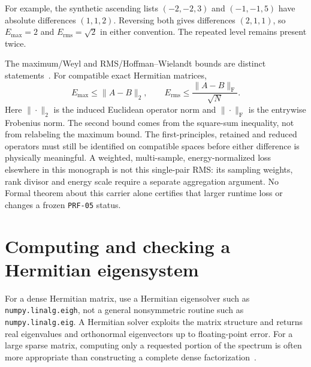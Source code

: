 For example, the synthetic ascending lists $(-2,-2,3)$ and $(-1,-1,5)$
have absolute differences $(1,1,2)$. Reversing both gives differences
$(2,1,1)$, so $E_{\max}=2$ and $E_{\mathrm{rms}}=\sqrt2$ in either
convention. The repeated level remains present twice.

The maximum/Weyl and RMS/Hoffman--Wielandt bounds are distinct
statements~\cite{hornJohnson2013}. For compatible exact Hermitian matrices,
\begin{equation}
  E_{\max}\leq\|A-B\|_2,
  \qquad
  E_{\mathrm{rms}}\leq\frac{\|A-B\|_{\mathrm F}}{\sqrt N}.
  \label{eq:training-weyl-hoffman-wielandt-distinction}
\end{equation}
Here $\|\cdot\|_2$ is the induced Euclidean operator norm and
$\|\cdot\|_{\mathrm F}$ is the entrywise Frobenius norm. The second bound
comes from the square-sum inequality, not from relabeling the maximum bound.
The first-principles, retained and reduced operators must still be identified
on compatible spaces before either difference is physically meaningful.
A weighted, multi-sample, energy-normalized loss elsewhere in this monograph
is not this single-pair RMS: its sampling weights, rank divisor and energy
scale require a separate aggregation argument. No Formal theorem about
this carrier alone certifies that larger runtime loss or changes a frozen
\texttt{PRF-05} status.

\section{Computing and checking a Hermitian eigensystem}

For a dense Hermitian matrix, use a Hermitian eigensolver such as
\texttt{numpy.linalg.eigh}, not a general nonsymmetric routine such as
\texttt{numpy.linalg.eig}. A Hermitian solver exploits the matrix structure and
returns real eigenvalues and orthonormal eigenvectors up to floating-point
error. For a large sparse matrix, computing only a requested portion of the
spectrum is often more appropriate than constructing a complete dense
factorization~\cite{golubVanLoan2013}.


